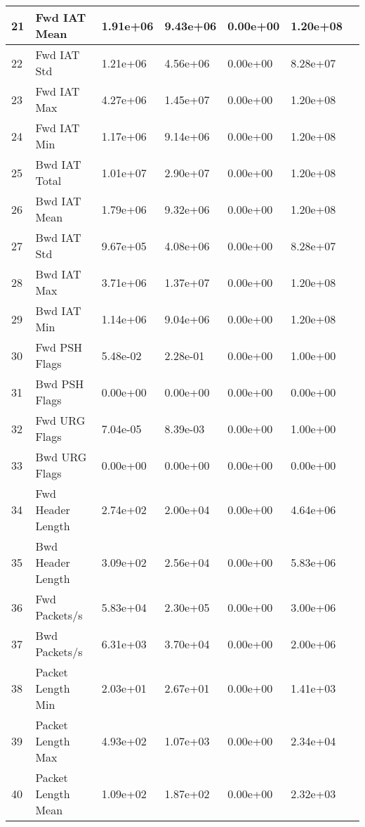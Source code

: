 \begin{center}
\begin{longtable}{|l|l|l|l|l|l|l|}
        \hline
        21 & Fwd IAT Mean & 1.91e+06 & 9.43e+06 & 0.00e+00 & 1.20e+08 \\
        \hline
        22 & Fwd IAT Std & 1.21e+06 & 4.56e+06 & 0.00e+00 & 8.28e+07 \\
        \hline
        23 & Fwd IAT Max & 4.27e+06 & 1.45e+07 & 0.00e+00 & 1.20e+08 \\
        \hline
        24 & Fwd IAT Min & 1.17e+06 & 9.14e+06 & 0.00e+00 & 1.20e+08 \\
        \hline
        25 & Bwd IAT Total & 1.01e+07 & 2.90e+07 & 0.00e+00 & 1.20e+08 \\
        \hline
        26 & Bwd IAT Mean & 1.79e+06 & 9.32e+06 & 0.00e+00 & 1.20e+08 \\
        \hline
        27 & Bwd IAT Std & 9.67e+05 & 4.08e+06 & 0.00e+00 & 8.28e+07 \\
        \hline
        28 & Bwd IAT Max & 3.71e+06 & 1.37e+07 & 0.00e+00 & 1.20e+08 \\
        \hline
        29 & Bwd IAT Min & 1.14e+06 & 9.04e+06 & 0.00e+00 & 1.20e+08 \\
        \hline
        30 & Fwd PSH Flags & 5.48e-02 & 2.28e-01 & 0.00e+00 & 1.00e+00 \\
        \hline
        31 & Bwd PSH Flags & 0.00e+00 & 0.00e+00 & 0.00e+00 & 0.00e+00 \\
        \hline
        32 & Fwd URG Flags & 7.04e-05 & 8.39e-03 & 0.00e+00 & 1.00e+00 \\
        \hline
        33 & Bwd URG Flags & 0.00e+00 & 0.00e+00 & 0.00e+00 & 0.00e+00 \\
        \hline
        34 & Fwd Header Length & 2.74e+02 & 2.00e+04 & 0.00e+00 & 4.64e+06 \\
        \hline
        35 & Bwd Header Length & 3.09e+02 & 2.56e+04 & 0.00e+00 & 5.83e+06 \\
        \hline
        36 & Fwd Packets/s & 5.83e+04 & 2.30e+05 & 0.00e+00 & 3.00e+06 \\
        \hline
        37 & Bwd Packets/s & 6.31e+03 & 3.70e+04 & 0.00e+00 & 2.00e+06 \\
        \hline
        38 & Packet Length Min & 2.03e+01 & 2.67e+01 & 0.00e+00 & 1.41e+03 \\
        \hline
        39 & Packet Length Max & 4.93e+02 & 1.07e+03 & 0.00e+00 & 2.34e+04 \\
        \hline
        40 & Packet Length Mean & 1.09e+02 & 1.87e+02 & 0.00e+00 & 2.32e+03 \\
        \hline

\end{longtable}
\end{center}
